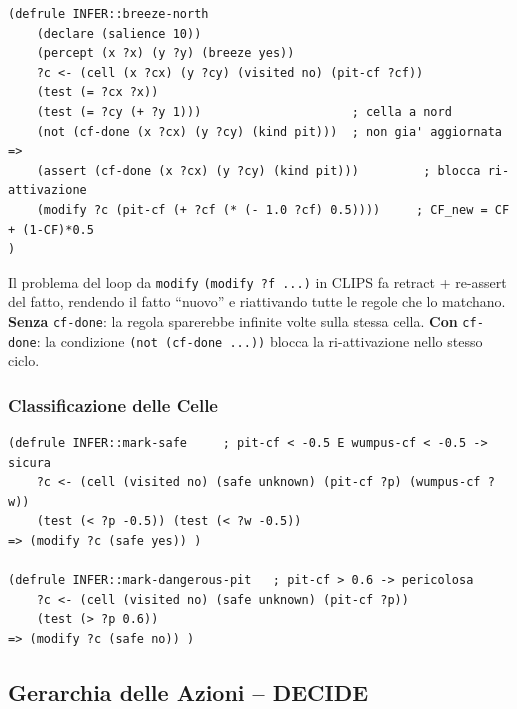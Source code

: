 \documentclass[12pt,a4paper]{article}
\begin{document}
\begin{lstlisting}[language=CLIPS]
(defrule INFER::breeze-north
    (declare (salience 10))
    (percept (x ?x) (y ?y) (breeze yes))
    ?c <- (cell (x ?cx) (y ?cy) (visited no) (pit-cf ?cf))
    (test (= ?cx ?x))
    (test (= ?cy (+ ?y 1)))                     ; cella a nord
    (not (cf-done (x ?cx) (y ?cy) (kind pit)))  ; non gia' aggiornata
=>
    (assert (cf-done (x ?cx) (y ?cy) (kind pit)))         ; blocca ri-attivazione
    (modify ?c (pit-cf (+ ?cf (* (- 1.0 ?cf) 0.5))))     ; CF_new = CF + (1-CF)*0.5
)
\end{lstlisting}

\begin{warnbox}{Il problema del loop da \texttt{modify}}
\texttt{(modify ?f ...)} in CLIPS fa retract + re-assert del fatto, rendendo il
fatto ``nuovo'' e riattivando tutte le regole che lo matchano.
\textbf{Senza} \texttt{cf-done}: la regola sparerebbe infinite volte sulla stessa
cella. \textbf{Con} \texttt{cf-done}: la condizione \texttt{(not (cf-done ...))}
blocca la ri-attivazione nello stesso ciclo.
\end{warnbox}

\subsubsection{Classificazione delle Celle}

\begin{lstlisting}[language=CLIPS]
(defrule INFER::mark-safe     ; pit-cf < -0.5 E wumpus-cf < -0.5 -> sicura
    ?c <- (cell (visited no) (safe unknown) (pit-cf ?p) (wumpus-cf ?w))
    (test (< ?p -0.5)) (test (< ?w -0.5))
=> (modify ?c (safe yes)) )

(defrule INFER::mark-dangerous-pit   ; pit-cf > 0.6 -> pericolosa
    ?c <- (cell (visited no) (safe unknown) (pit-cf ?p))
    (test (> ?p 0.6))
=> (modify ?c (safe no)) )
\end{lstlisting}

\subsection{Gerarchia delle Azioni -- DECIDE}
\end{document}
